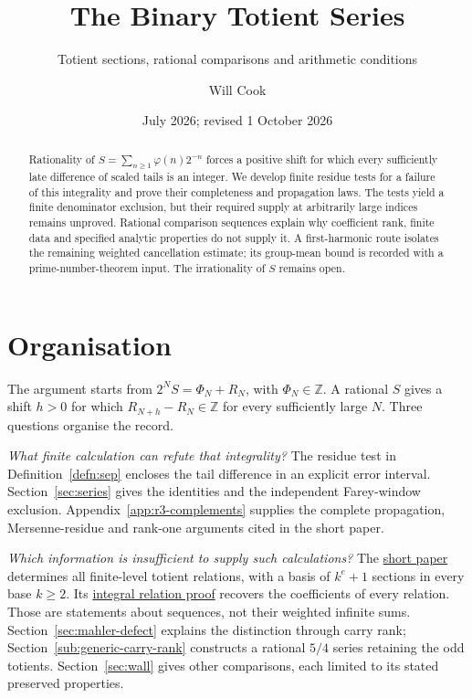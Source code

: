 \documentclass[11pt]{article}
\title{The Binary Totient Series}
\subtitle{Totient sections, rational comparisons and arithmetic conditions}
\author{Will Cook}
\date{July 2026; revised 1 October 2026}
\theoremstyle{plain}
\theoremstyle{definition}
\theoremstyle{remark}
\newcommand{\Z}{\mathbb{Z}}
\newcommand{\shortpaper}[2]{\href{erdos-249-binary-totient-series.pdf\##1}{#2}}
\begin{document}
\maketitle

\paperprovenance

\begin{abstract}
Rationality of $S=\sum_{n\ge1}\varphi(n)2^{-n}$ forces a positive
shift for which every sufficiently late difference of scaled tails
is an integer. We develop finite residue tests for a failure of this
integrality and prove their completeness and propagation laws.
The tests yield a finite denominator exclusion, but their required
supply at arbitrarily large indices remains unproved. Rational
comparison sequences explain why coefficient rank, finite data and
specified analytic properties do not supply it. A first-harmonic
route isolates the remaining weighted cancellation estimate; its
group-mean bound is recorded with a prime-number-theorem input.
The irrationality of $S$ remains open.
\end{abstract}

\section*{Organisation}
The argument starts from $2^NS=\Phi_N+R_N$, with $\Phi_N\in\Z$.
A rational $S$ gives a shift $h>0$ for which $R_{N+h}-R_N\in\Z$
for every sufficiently large $N$. Three questions organise the record.

\emph{What finite calculation can refute that integrality?}
The residue test in Definition~\ref{defn:sep} encloses the tail
difference in an explicit error interval. Section~\ref{sec:series}
gives the identities and the independent Farey-window exclusion.
Appendix~\ref{app:r3-complements} supplies the complete propagation,
Mersenne-residue and rank-one arguments cited in the short paper.

\emph{Which information is insufficient to supply such calculations?}
The \shortpaper{short249-basis}{short paper} determines all finite-level
totient relations, with a basis of $k^e+1$ sections in every base
$k\ge2$. Its \shortpaper{short249-base-six}{integral relation proof}
recovers the coefficients of every relation. Those are statements
about sequences, not their weighted infinite sums.
Section~\ref{sec:mahler-defect} explains the distinction through
carry rank; Section~\ref{sub:generic-carry-rank} constructs a rational
$5/4$ series retaining the odd totients. Section~\ref{sec:wall}
gives other comparisons, each limited to its stated preserved properties.
\end{document}
